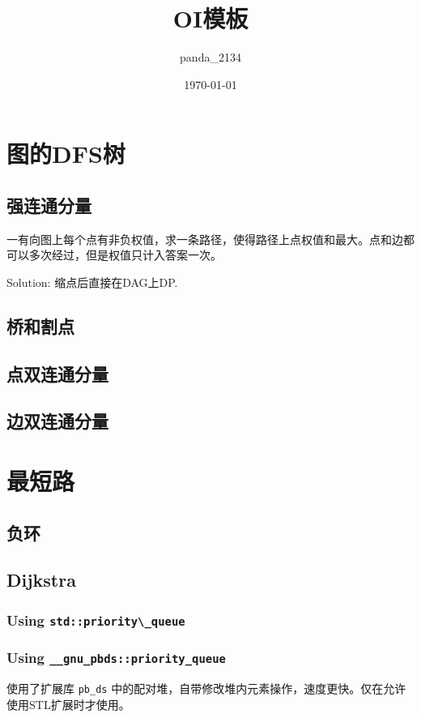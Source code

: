 \documentclass{article}
\title{OI模板}
\author{panda\_2134}
\date{\today}
\begin{document}
	\makeatletter
	\lst@CCPutMacro
    	\@empty\z@\@empty
	\makeatother

	\maketitle
	\newpage
	\tableofcontents
	\newpage

	\section{图的DFS树}
		\subsection{强连通分量}
		
		一有向图上每个点有非负权值，求一条路径，使得路径上点权值和最大。点和边都可以多次经过，但是权值只计入答案一次。
		
		Solution: 缩点后直接在DAG上DP.
		
		
		\subsection{桥和割点}
		\subsection{点双连通分量}
		\subsection{边双连通分量}

	\newpage
	\section{最短路}
		\subsection{负环}
			
		\subsection{Dijkstra}
			\subsubsection{Using \lstinline|std::priority\_queue|}
			
			\subsubsection{Using \lstinline|__gnu_pbds::priority_queue|}
			使用了扩展库 \lstinline|pb_ds| 中的配对堆，自带修改堆内元素操作，速度更快。仅在允许使用STL扩展时才使用。
			
\end{document}
